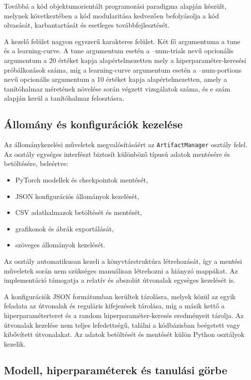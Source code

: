 Továbbá a kód objektumorientált programozási paradigma alapján készült, melynek következtében a kód modularitása kedvezően befolyásolja a 
kód olvasását, karbantartását és esetleges továbbfejlesztését.

A kezelő felület nagyon egyszerű karakteres felület. Két fő argumentuma a tune és a learning-curve. A tune argumentum esetén a --num-trials nevű opcionális argumentum a 20 értéket kapja alapértelmezetten mely a 
hiperparaméter-keresési próbálkozások száma, míg a learning-curve argumentum esetén a --num-portions nevű opcionális argumentum a 10 értéket kapja alapértelmezetten, amely a tanítóhalmaz méretének növelése során 
végzett vizsgálatok száma, és e szám alapján kerül a tanítóhalmaz felosztásra.

\subsection{Állomány és konfigurációk kezelése}

Az állománykezelési műveletek megvalósításáért az \texttt{ArtifactManager} osztály felel. 
Az osztály egységes interfészt biztosít különböző típusú adatok mentésére és betöltésére, beleértve:

\begin{itemize}
    \item PyTorch modellek és checkpointok mentését,
    \item JSON konfigurációs állományok kezelését,
    \item CSV adathalmazok betöltését és mentését,
    \item grafikonok és ábrák exportálását,
    \item szöveges állományok kezelését.
\end{itemize}

Az osztály automatikusan kezeli a könyvtárstruktúra létrehozását, így a mentési műveletek során nem szükséges manuálisan létrehozni a hiányzó mappákat. 
Az implementáció támogatja a relatív és abszolút útvonalak egységes kezelését is.

A konfigurációk JSON formátumban kerültek tárolásra, melyek közül az egyik feladata az útvonalak és reguláris kifejezések tárolása, míg a másik kettő a hiperparaméterteret és 
a random hiperparaméter-keresés eredményeit tárolja. Az útvonalak kezelése nem teljes lefedettségű, találni a kódbázisban beégetett vagy kibővített útvonalakat. Az adatok betöltését és mentését 
külön Python osztályok kezelik.

\subsection{Modell, hiperparaméterek és tanulási görbe}

